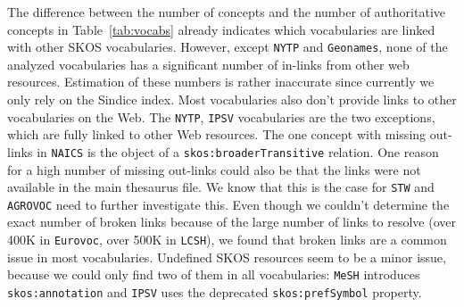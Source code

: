 
The difference between the number of concepts and the number of authoritative concepts in Table~\ref{tab:vocabs} already indicates which vocabularies are linked with other SKOS vocabularies.
However, except \texttt{NYTP} and \texttt{Geonames}, none of the analyzed vocabularies has a significant number of in-links from other web resources. Estimation of these numbers is rather inaccurate since currently we only rely on the Sindice index. 
Most vocabularies also don't provide links to other vocabularies on the Web. The \texttt{NYTP}, \texttt{IPSV} vocabularies are the two exceptions, which are fully linked to other Web resources. The one concept with missing out-links in \texttt{NAICS} is the object of a \texttt{skos:broaderTransitive} relation. One reason for a high number of missing out-links could also be that the links were not available in the main thesaurus file. We know that this is the case for \texttt{STW} and \texttt{AGROVOC} need to further investigate this.
Even though we couldn't determine the exact number of broken links because of the large number of links to resolve  (over 400K in \texttt{Eurovoc}, over 500K in \texttt{LCSH}), we found that broken links are a common issue in most vocabularies.
Undefined SKOS resources seem to be a minor issue, because we could only find two of them in all vocabularies: \texttt{MeSH} introduces \texttt{skos:annotation} and \texttt{IPSV} uses the deprecated \texttt{skos:prefSymbol} property.
